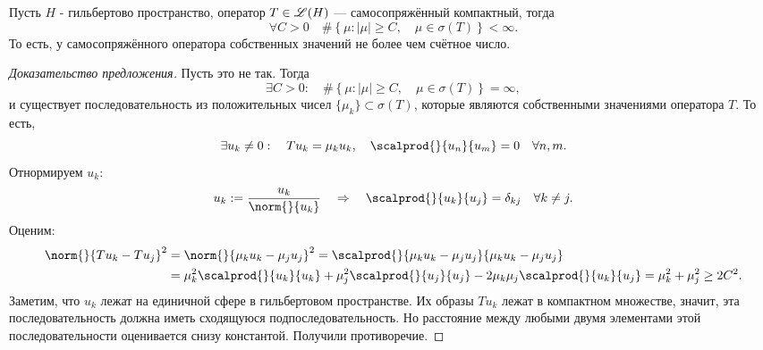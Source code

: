 \begin{prop} Пусть $H$ - гильбертово пространство, оператор $T \in \mathscr{L}(H)$ --- самосопряжённый компактный, тогда
$$ \forall C > 0 \quad \# \left\{ \mu : | \mu | \geq C, \quad \mu \in \sigma(T) \right\} < \infty.$$
То есть, у самосопряжённого оператора собственных значений не более чем счётное число.
\end{prop}
\begin{proof}[Доказательство предложения]
Пусть это не так. Тогда
$$ \exists C > 0 : \quad \#\left\{ \mu : | \mu | \geq C, \quad \mu \in \sigma(T) \right\} = \infty,$$
и существует последовательность из положительных чисел $\{ \mu_k \} \subset \sigma(T)$, которые являются собственными значениями оператора $T$. То есть,
$$ \exists u_k \neq 0 : \quad T u_k = \mu_k u_k, \quad \scalprod{}{u_n}{u_m} = 0 \quad \forall n,m. $$ Отнормируем $u_k$:
$$ u_k := \frac {u_k}{\norm{}{u_k}} \quad \Rightarrow \quad \scalprod{}{u_k}{u_j} = \delta_{kj} \quad \forall k \neq j.$$
Оценим:
\begin{align*}
\norm{}{Tu_k - Tu_j}^2 &= \norm{}{\mu_k u_k - \mu_j u_j}^2 = \scalprod{}{\mu_k u_k - \mu_j u_j}{\mu_k u_k - \mu_j u_j} \\
&= \mu_k^2 \scalprod{}{u_k}{u_k} + \mu_j^2 \scalprod{}{u_j}{u_j} - 2 \mu_k \mu_j \scalprod{}{u_k}{u_j} = \mu_k^2 + \mu_j^2 \geq 2C^2.
\end{align*}
Заметим, что $u_k$ лежат на единичной сфере в гильбертовом пространстве. Их образы $Tu_k$ лежат в компактном множестве, значит, эта последовательность должна иметь сходящуюся подпоследовательность. Но расстояние между любыми двумя элементами этой последовательности оценивается снизу константой. Получили противоречие.

\end{proof}

